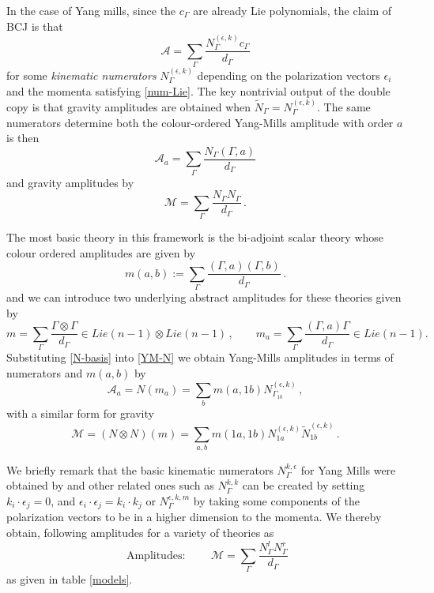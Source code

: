 \documentclass[11pt]{article}
\newcommand{\cA}{\mathcal{A}}
\newcommand{\cM}{\mathcal{M}}
\newcommand{\1}{{\rm 1\hskip-0.25em I}}
\begin{document}
In the case of Yang mills, since the $c_\Gamma$ are already Lie polynomials, the claim of BCJ \cite{Bern:2008qj} is that
\begin{equation}
\cA=\sum_\Gamma\frac{N_\Gamma^{(\epsilon,k)} c_\Gamma}{d_\Gamma}
\end{equation}
for some \emph{kinematic numerators} $N_\Gamma^{(\epsilon,k)}$ depending on the polarization vectors $\epsilon_i$ and the momenta satisfying \eqref{num-Lie}.  The key nontrivial output of the double copy is that gravity amplitudes are obtained  when $\tilde N_\Gamma=N_\Gamma^{(\epsilon,k)}$. The same numerators determine both 
the colour-ordered Yang-Mills amplitude with order $a$ is then
\begin{equation}
\cA_a = \sum_\Gamma \frac{N_\Gamma (\Gamma,a)}{d_\Gamma }\label{YM-N}
\end{equation}
and gravity amplitudes by
\begin{equation}
\cM = \sum_\Gamma \frac{N_\Gamma N_\Gamma}{d_\Gamma }\, .
\end{equation}



The most basic theory in this framework is the bi-adjoint scalar theory whose colour ordered amplitudes are given by
\begin{equation}
m(a,b):=\sum_\Gamma \frac{(\Gamma,a)(\Gamma,b)}{d_\Gamma}\, .
\end{equation}
and we can introduce two underlying abstract amplitudes for these theories given by
\begin{equation}
m=\sum_\Gamma \frac{\Gamma\otimes \Gamma}{d_\Gamma}\in Lie(n-1)\otimes Lie(n-1) \,, \qquad m_a=\sum_\Gamma\frac{(\Gamma,a)\Gamma}{d_\Gamma}\in Lie(n-1) .
\end{equation}
Substituting \eqref{N-basis} into \eqref{YM-N} we obtain Yang-Mills amplitudes in terms of numerators and $m(a,b)$ by
\begin{equation}
\cA_a=N(m_a)=\sum_b m(a,1b) N_{\Gamma_{1b}}^{(\epsilon,k)}\, ,\label{A-m-N}
\end{equation}
with a similar form for gravity
\begin{equation}
\cM=(N\otimes N)(m) =\sum_{a,b} m(1a,1b)N_{1a}^{(\epsilon,k)}\tilde N_{1b}^{(\epsilon,k)}\,.
\end{equation} 

We briefly remark that the basic kinematic numerators $N^{k,\epsilon}_\Gamma$ for Yang Mills were obtained by \cite{Fu:2017uzt} and other related ones such as $N^{k,k}_\Gamma$ can be created by setting $k_i\cdot \epsilon_j=0$, and $\epsilon_i\cdot \epsilon_j=k_i\cdot k_j$ or $N^{\epsilon,k,m}_\Gamma$ by taking some components of the polarization vectors to be in a higher dimension to the momenta. We thereby obtain, following \cite{Cachazo:2014xea,Casali:2015vta} amplitudes for a variety of theories as
$$
\mbox{ Amplitudes: }\qquad\cM=\sum_\Gamma \frac{N_\Gamma ^l N_\Gamma^r}{d_\Gamma}
$$
as given in table \ref{models}.
\end{document}
